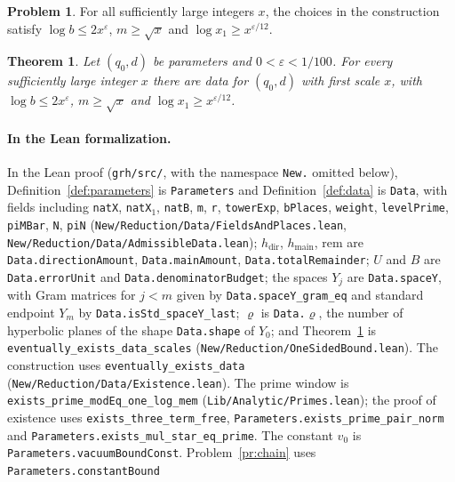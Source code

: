 \documentclass[reqno]{amsart}
\theoremstyle{plain}
\newtheorem{theorem}{Theorem}[section]
\theoremstyle{definition}
\newtheorem{problem}{Problem}[section]
\newcommand{\hdir}{h_{\mathrm{dir}}}
\newcommand{\hmain}{h_{\mathrm{main}}}
\newcommand{\rem}{\mathrm{rem}}
\begin{document}
\begin{problem}\label{pr:eps-bounds}
For all sufficiently large integers \(x\), the choices in the construction satisfy \(\log b \le 2x^\varepsilon\), \(m \ge \sqrt x\) and \(\log x_1 \ge x^{\varepsilon/12}\).
\end{problem}

\begin{theorem}\label{thm:existence}
Let \((q_0, d)\) be parameters and \(0 < \varepsilon < 1/100\).  For every sufficiently large integer \(x\) there are data for \((q_0, d)\) with first scale \(x\), with \(\log b \le 2x^\varepsilon\), \(m \ge \sqrt x\) and \(\log x_1 \ge x^{\varepsilon/12}\).
\end{theorem}

{\raggedright
\paragraph{In the Lean formalization.}
In the Lean proof \cite{GL} (\texttt{grh/src/}, with the namespace \texttt{New.} omitted below), Definition~\ref{def:parameters} is \texttt{Parameters} and Definition~\ref{def:data} is \texttt{Data}, with fields including \texttt{natX}, \texttt{natX\(_1\)}, \texttt{natB}, \texttt{m}, \texttt{r}, \texttt{towerExp}, \texttt{bPlaces}, \texttt{weight}, \texttt{levelPrime}, \texttt{piMBar}, \texttt{N}, \texttt{piN} (\texttt{New/Reduction/Data/FieldsAndPlaces.lean}, \texttt{New/Reduction/Data/AdmissibleData.lean}); \(\hdir\), \(\hmain\), \(\rem\) are \texttt{Data.directionAmount}, \texttt{Data.mainAmount}, \texttt{Data.totalRemainder}; \(U\) and \(B\) are \texttt{Data.errorUnit} and \texttt{Data.denominatorBudget}; the spaces \(Y_j\) are \texttt{Data.spaceY}, with Gram matrices for \(j<m\) given by \texttt{Data.spaceY\_gram\_eq} and standard endpoint \(Y_m\) by \texttt{Data.isStd\_spaceY\_last}; \(\varrho\) is \texttt{Data.\(\varrho\)}, the number of hyperbolic planes of the shape \texttt{Data.shape} of \(Y_0\); and Theorem~\ref{thm:existence} is \texttt{eventually\_exists\_data\_scales}
(\texttt{New/Reduction/OneSidedBound.lean}).  The construction uses
\texttt{eventually\_exists\_data} (\texttt{New/Reduction/Data/Existence.lean}).  The prime window is \texttt{exists\_prime\_modEq\_one\_log\_mem} (\texttt{Lib/Analytic/Primes.lean}); the proof of existence uses \texttt{exists\_three\_term\_free}, \texttt{Parameters.exists\_prime\_pair\_norm} and \texttt{Parameters.exists\_mul\_star\_eq\_prime}.  The constant \(v_0\) is \texttt{Parameters.vacuumBoundConst}.
Problem~\ref{pr:chain} uses \texttt{Parameters.constantBound}
}
\end{document}
